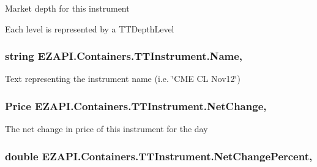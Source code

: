 Market depth for this instrument 

Each level is represented by a T\-T\-Depth\-Level\hypertarget{class_e_z_a_p_i_1_1_containers_1_1_t_t_instrument_a87cf4ed780ad325b1f838ee97c043fe3}{
\subsubsection[{Name}]{\setlength{\rightskip}{0pt plus 5cm}string E\-Z\-A\-P\-I.\-Containers.\-T\-T\-Instrument.\-Name\hspace{0.3cm}{\ttfamily [get]}, {\ttfamily [set]}}}\label{class_e_z_a_p_i_1_1_containers_1_1_t_t_instrument_a87cf4ed780ad325b1f838ee97c043fe3}


Text representing the instrument name (i.\-e. \char`\"{}\-C\-M\-E C\-L Nov12\char`\"{}) 

\hypertarget{class_e_z_a_p_i_1_1_containers_1_1_t_t_instrument_aa603e1f65e403735c026065d28669292}{
\subsubsection[{Net\-Change}]{\setlength{\rightskip}{0pt plus 5cm}Price E\-Z\-A\-P\-I.\-Containers.\-T\-T\-Instrument.\-Net\-Change\hspace{0.3cm}{\ttfamily [get]}, {\ttfamily [set]}}}\label{class_e_z_a_p_i_1_1_containers_1_1_t_t_instrument_aa603e1f65e403735c026065d28669292}


The net change in price of this instrument for the day 

\hypertarget{class_e_z_a_p_i_1_1_containers_1_1_t_t_instrument_afe80f04bedf1e51d1983bc81798fae80}{
\subsubsection[{Net\-Change\-Percent}]{\setlength{\rightskip}{0pt plus 5cm}double E\-Z\-A\-P\-I.\-Containers.\-T\-T\-Instrument.\-Net\-Change\-Percent\hspace{0.3cm}{\ttfamily [get]}, {\ttfamily [set]}}}\label{class_e_z_a_p_i_1_1_containers_1_1_t_t_instrument_afe80f04bedf1e51d1983bc81798fae80}


